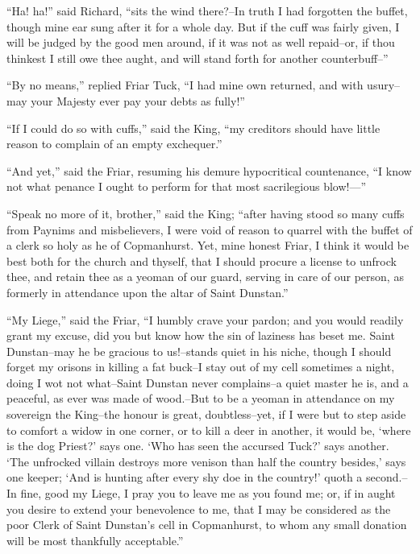 ``Ha! ha!'' said Richard, ``sits the wind there?--In truth I had
forgotten the buffet, though mine ear sung after it for a whole day. But
if the cuff was fairly given, I will be judged by the good men around,
if it was not as well repaid--or, if thou thinkest I still owe thee
aught, and will stand forth for another counterbuff--''

``By no means,'' replied Friar Tuck, ``I had mine own returned, and with
usury--may your Majesty ever pay your debts as fully!''

``If I could do so with cuffs,'' said the King, ``my creditors should
have little reason to complain of an empty exchequer.''

``And yet,'' said the Friar, resuming his demure hypocritical
countenance, ``I know not what penance I ought to perform for that most
sacrilegious blow!---''

``Speak no more of it, brother,'' said the King; ``after having stood so
many cuffs from Paynims and misbelievers, I were void of reason to
quarrel with the buffet of a clerk so holy as he of Copmanhurst. Yet,
mine honest Friar, I think it would be best both for the church and
thyself, that I should procure a license to unfrock thee, and retain
thee as a yeoman of our guard, serving in care of our person, as
formerly in attendance upon the altar of Saint Dunstan.''

``My Liege,'' said the Friar, ``I humbly crave your pardon; and you
would readily grant my excuse, did you but know how the sin of laziness
has beset me. Saint Dunstan--may he be gracious to us!--stands quiet in
his niche, though I should forget my orisons in killing a fat buck--I
stay out of my cell sometimes a night, doing I wot not what--Saint
Dunstan never complains--a quiet master he is, and a peaceful, as ever
was made of wood.--But to be a yeoman in attendance on my sovereign the
King--the honour is great, doubtless--yet, if I were but to step aside
to comfort a widow in one corner, or to kill a deer in another, it would
be, `where is the dog Priest?' says one. `Who has seen the accursed
Tuck?' says another. `The unfrocked villain destroys more venison than
half the country besides,' says one keeper; `And is hunting after every
shy doe in the country!' quoth a second.--In fine, good my Liege, I pray
you to leave me as you found me; or, if in aught you desire to extend
your benevolence to me, that I may be considered as the poor Clerk of
Saint Dunstan's cell in Copmanhurst, to whom any small donation will be
most thankfully acceptable.''

